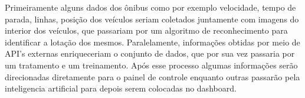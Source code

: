 \indent
\par Primeiramente alguns dados dos ônibus como por exemplo velocidade, tempo de parada, linhas, posição dos veículos seriam coletados juntamente com imagens do interior dos veículos, que passariam por um algoritmo de reconhecimento para identificar a lotação dos mesmos. Paralelamente, informações obtidas por meio de API's externas enriqueceriam o conjunto de dados, que por sua vez passaria por um tratamento e um treinamento. Após esse processo algumas informações serão direcionadas diretamente para o painel de controle enquanto outras passarão pela inteligencia artificial para depois serem colocadas no dashboard.

